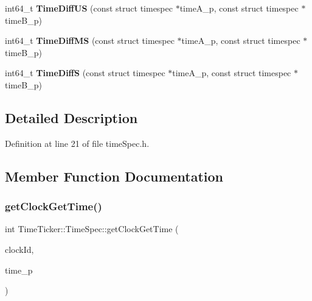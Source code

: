 \begin{DoxyCompactItemize}
\item 
\mbox{\label{classTimeTicker_1_1TimeSpec_aeb775b209f46b75f41b79a8bde9be5d7}} 
int64\+\_\+t {\bfseries Time\+Diff\+US} (const struct timespec $\ast$time\+A\+\_\+p, const struct timespec $\ast$time\+B\+\_\+p)
\item 
\mbox{\label{classTimeTicker_1_1TimeSpec_ad74c0e1828def0c236eaf3514c604dc3}} 
int64\+\_\+t {\bfseries Time\+Diff\+MS} (const struct timespec $\ast$time\+A\+\_\+p, const struct timespec $\ast$time\+B\+\_\+p)
\item 
\mbox{\label{classTimeTicker_1_1TimeSpec_a1b6e356f7e24b9c67feda9a3ea39fc9f}} 
int64\+\_\+t {\bfseries Time\+DiffS} (const struct timespec $\ast$time\+A\+\_\+p, const struct timespec $\ast$time\+B\+\_\+p)
\end{DoxyCompactItemize}


\subsection{Detailed Description}


Definition at line 21 of file time\+Spec.\+h.



\subsection{Member Function Documentation}
\mbox{\label{classTimeTicker_1_1TimeSpec_a14c9bee4971b193847d1a4a77dcc73a5}} 
\subsubsection{\texorpdfstring{getClockGetTime()}{getClockGetTime()}}
{\footnotesize\ttfamily int Time\+Ticker\+::\+Time\+Spec\+::get\+Clock\+Get\+Time (\begin{DoxyParamCaption}\item[{T\+T\+Time\+Clock\+Id}]{clock\+Id,  }\item[{T\+T\+\_\+timespec\+\_\+t $\ast$}]{time\+\_\+p }\end{DoxyParamCaption})}



